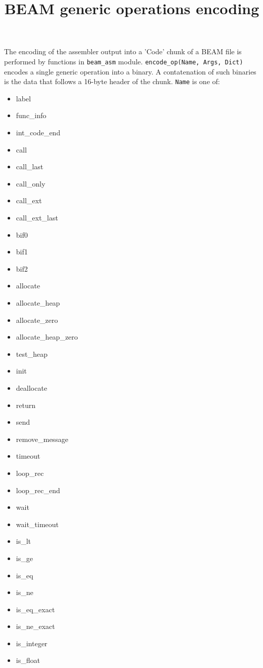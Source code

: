 \documentclass{article}
\title{BEAM generic operations encoding}
\begin{document}
\maketitle

The encoding of the assembler output into a 'Code' chunk of a BEAM file is
performed by functions in \verb$beam_asm$ module. \verb$encode_op(Name, Args, Dict)$
encodes a single generic operation into a binary. A contatenation of such
binaries is the data that follows a 16-byte header of the chunk. \verb$Name$ is one
of$:$

\begin{multicols}{3}
\begin{itemize}
\item label
\item func\_info
\item int\_code\_end
\item call
\item call\_last
\item call\_only
\item call\_ext
\item call\_ext\_last
\item bif0
\item bif1
\item bif2
\item allocate
\item allocate\_heap
\item allocate\_zero
\item allocate\_heap\_zero
\item test\_heap
\item init
\item deallocate
\item return
\item send
\item remove\_message
\item timeout
\item loop\_rec
\item loop\_rec\_end
\item wait
\item wait\_timeout
\item is\_lt
\item is\_ge
\item is\_eq
\item is\_ne
\item is\_eq\_exact
\item is\_ne\_exact
\item is\_integer
\item is\_float

\end{itemize}
\end{multicols}
\end{document}
